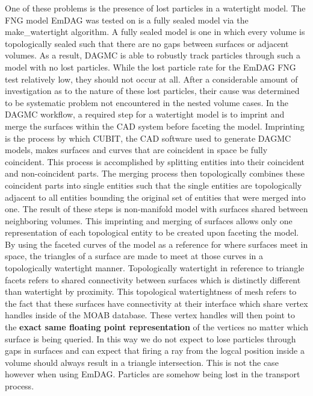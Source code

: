 \documentclass[12pt, a4paper]{article}
\begin{document}
One of these problems is the presence of lost particles in a watertight model. The FNG model EmDAG was tested on is a fully sealed model via the make\_watertight algorithm. A fully sealed model is one in which every volume is topologically sealed such that there are no gaps between surfaces or adjacent volumes. As a result, DAGMC is able to robustly track particles through such a model with no lost particles. While the lost particle rate for the EmDAG FNG test relatively low, they should not occur at all. After a considerable amount of investigation as to the nature of these lost particles, their cause was determined to be systematic problem not encountered in the nested volume cases. In the DAGMC workflow, a required step for a watertight model is to imprint and merge the surfaces within the CAD system before faceting the model. Imprinting is the process by which CUBIT, the CAD software used to generate DAGMC models, makes surfaces and curves that are coincident in space be fully coincident. This process is accomplished by splitting entities into their coincident and non-coincident parts. The merging process then topologically combines these coincident parts into single entities such that the single entities are topologically adjacent to all entities bounding the original set of entities that were merged into one. The result of these steps is non-manifold model with surfaces shared between neighboring volumes. \cite{smith_thesis_2011} This imprinting and merging of surfaces allows only one representation of each topological entity to be created upon faceting the model. By using the faceted curves of the model as a reference for where surfaces meet in space, the triangles of a surface are made to meet at those curves in a topologically watertight manner. Topologically watertight in reference to triangle facets refers to shared connectivity between surfaces which is distinctly different than watertight by proximity. This topological watertightness of mesh refers to the fact that these surfaces have connectivity at their interface which share vertex handles inside of the MOAB database. These vertex handles will then point to the \textbf{exact same floating point representation} of the vertices no matter which surface is being queried. In this way we do not expect to lose particles through gaps in surfaces and can expect that firing a ray from the logcal position inside a volume should always result in a triangle intersection. This is not the case however when using EmDAG. Particles are somehow being lost in the transport process.
\end{document}
